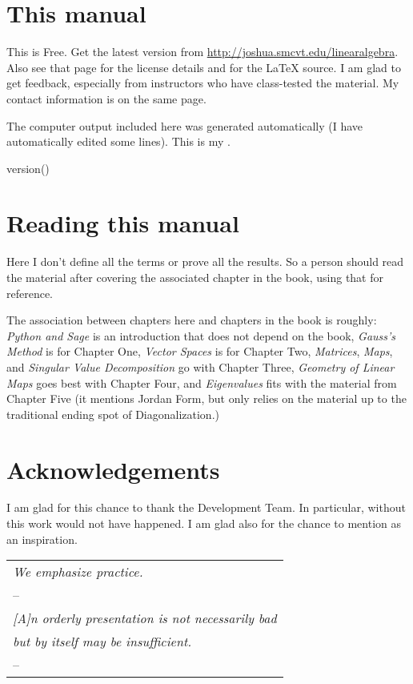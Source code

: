 \section{This manual}
This is Free.
Get the latest version from 
\url{http://joshua.smcvt.edu/linearalgebra}.
Also see that page for the license details and for 
the \LaTeX{} source.
I am glad to get feedback, especially from instructors
who have class-tested the material.
My contact information is on the same page. 

The computer output included here was generated automatically 
(I have automatically edited some lines).
This is my \Sage.
\begin{sageoutput}[d,0,1]
version()  
\end{sageoutput}



\section{Reading this manual}
Here I don't define all the terms or prove all the results.
So a person should read the material after covering the associated
chapter in the book, using that for reference.

The association between chapters here and chapters in the book is roughly:
\textit{Python and Sage} is an introduction that does not depend on the
book,
\textit{Gauss’s Method} is for Chapter One,
\textit{Vector Spaces} is for Chapter Two,
\textit{Matrices}, 
\textit{Maps}, and 
\textit{Singular Value Decomposition} go with Chapter Three,
\textit{Geometry of Linear Maps} goes best with Chapter Four,
and \textit{Eigenvalues} fits with the material from Chapter Five
(it mentions Jordan Form, but only relies on the material up to 
the traditional ending spot of Diagonalization.)






\section{Acknowledgements}
I am glad for this chance to thank the \Sage{} Development Team.
In particular,
without \citep{SageTeam12ref} this work would not have happened.
I am glad also for the chance to mention 
\citep{Beezer11} as an inspiration.





\vspace{.5in}
\noindent\begin{tabular}[t]{@{}l}
\textit{We emphasize practice.}  \\
\hspace*{5em}--\cite{Suzuki}  \\[.5ex]
\textit{[A]n orderly presentation is not necessarily bad} \\ 
\quad\textit{but by itself may be insufficient.}  \\
\hspace*{5em}--\cite{Brandt}  
\end{tabular}

